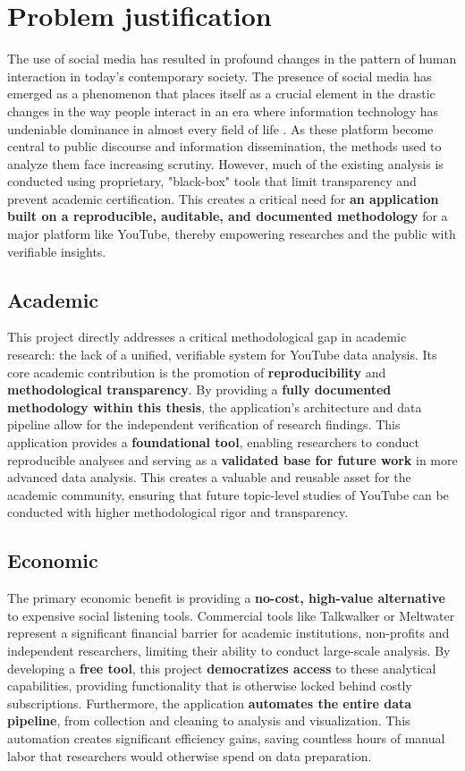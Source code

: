 \section{Problem justification}

The use of social media has resulted in profound changes in the pattern of human interaction in today's contemporary society. The presence of social media has emerged as a phenomenon that places itself as a crucial element in the drastic changes in the way people interact in an era where information technology has undeniable dominance in almost every field of life \parencite{azzaakiyyah2023impact}. As these platform become central to public discourse and information dissemination, the methods used to analyze them face increasing scrutiny. However, much of the existing analysis is conducted using proprietary, "black-box" tools that limit transparency and prevent academic certification. This creates a critical need for \textbf{an application built on a reproducible, auditable, and documented methodology} for a major platform like YouTube, thereby empowering researches and the public with verifiable insights.

\subsection{Academic}

This project directly addresses a critical methodological gap in academic research: the lack of a unified, verifiable system for YouTube data analysis. Its core academic contribution is the promotion of \textbf{reproducibility} and \textbf{methodological transparency}. By providing a \textbf{fully documented methodology within this thesis}, the application's architecture and data pipeline allow for the independent verification of research findings. This application provides a \textbf{foundational tool}, enabling researchers to conduct reproducible analyses and serving as a \textbf{validated base for future work} in more advanced data analysis. This creates a valuable and reusable asset for the academic community, ensuring that future topic-level studies of YouTube can be conducted with higher methodological rigor and transparency.

\subsection{Economic}

The primary economic benefit is providing a \textbf{no-cost, high-value alternative} to expensive social listening tools. Commercial tools like Talkwalker or Meltwater represent a significant financial barrier for academic institutions, non-profits and independent researchers, limiting their ability to conduct large-scale analysis. By developing a \textbf{free tool}, this project \textbf{democratizes access} to these analytical capabilities, providing functionality that is otherwise locked behind costly subscriptions. Furthermore, the application \textbf{automates the entire data pipeline}, from collection and cleaning to analysis and visualization. This automation creates significant efficiency gains, saving countless hours of manual labor that researchers would otherwise spend on data preparation.

